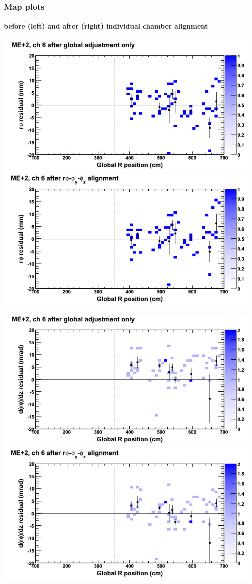 \documentclass[compress]{beamer}
\begin{document}
\begin{frame}
\frametitle{Map plots}
\framesubtitle{before (left) and after (right) individual chamber alignment}
\includegraphics[width=0.5\linewidth]{ringmapplots_3dof/before_CSCvsr_mep2ch06_x.png} \includegraphics[width=0.5\linewidth]{ringmapplots_3dof/after_CSCvsr_mep2ch06_x.png}

\includegraphics[width=0.5\linewidth]{ringmapplots_3dof/before_CSCvsr_mep2ch06_dxdz.png} \includegraphics[width=0.5\linewidth]{ringmapplots_3dof/after_CSCvsr_mep2ch06_dxdz.png}
\end{frame}
\end{document}

